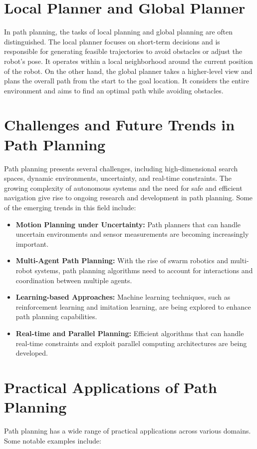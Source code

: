 \documentclass{article}
\begin{document}
\section{Local Planner and Global Planner}
In path planning, the tasks of local planning and global planning are often distinguished. The local planner focuses on short-term decisions and is responsible for generating feasible trajectories to avoid obstacles or adjust the robot's pose. It operates within a local neighborhood around the current position of the robot. On the other hand, the global planner takes a higher-level view and plans the overall path from the start to the goal location. It considers the entire environment and aims to find an optimal path while avoiding obstacles.

\section{Challenges and Future Trends in Path Planning}
Path planning presents several challenges, including high-dimensional search spaces, dynamic environments, uncertainty, and real-time constraints. The growing complexity of autonomous systems and the need for safe and efficient navigation give rise to ongoing research and development in path planning. Some of the emerging trends in this field include:

\begin{itemize}
\item \textbf{Motion Planning under Uncertainty:} Path planners that can handle uncertain environments and sensor measurements are becoming increasingly important.
\item \textbf{Multi-Agent Path Planning:} With the rise of swarm robotics and multi-robot systems, path planning algorithms need to account for interactions and coordination between multiple agents.
\item \textbf{Learning-based Approaches:} Machine learning techniques, such as reinforcement learning and imitation learning, are being explored to enhance path planning capabilities.
\item \textbf{Real-time and Parallel Planning:} Efficient algorithms that can handle real-time constraints and exploit parallel computing architectures are being developed.
\end{itemize}

\section{Practical Applications of Path Planning}
Path planning has a wide range of practical applications across various domains. Some notable examples include:
\end{document}
